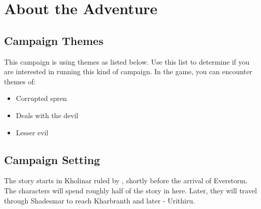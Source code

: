 \section{About the Adventure}


\subsection{Campaign Themes}

This campaign is using themes as listed below. Use this list to determine if you are interested in running this kind of campaign. In the game, you can encounter themes of:
\begin{itemize}
	\item Corrupted spren
	\item Deals with the devil
	\item Lesser evil
\end{itemize}

\subsection{Campaign Setting}

The story starts in Kholinar ruled by \npcQueen{}, shortly before the arrival of Everstorm. The characters will spend roughly half of the story in here. Later, they will travel through Shadesmar to reach Kharbranth and later - Urithiru.
